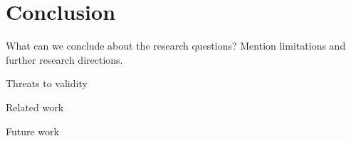 \chapter{Conclusion}

What can we conclude about the research questions? Mention limitations and further research directions.

Threats to validity

Related work

Future work

